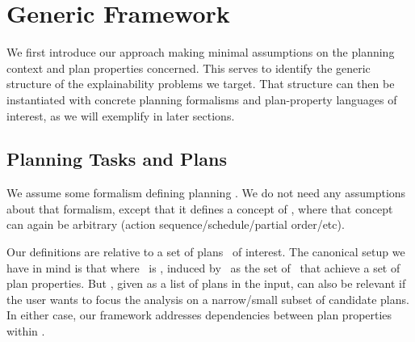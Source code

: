 \section{Generic Framework}

We first introduce our approach making minimal assumptions on the
planning context and plan properties concerned. This serves to
identify the generic structure of the explainability problems we
target. That structure can then be instantiated with concrete planning
formalisms and plan-property languages of interest, as we will
exemplify in later sections.




\subsection{Planning Tasks and Plans}

We assume some formalism defining planning  \task. We
do not need any assumptions about that formalism, except that it
defines a concept of  \plan, where that concept can
again be arbitrary (action sequence/schedule/partial order/etc). 

Our definitions are relative to a set of plans \plans\ of
interest. The canonical setup we have in mind is that where \plans\ is
, induced by \task\ as the set of \plan\ that
achieve a set of  plan properties. But
 \plans, given as a list of plans in the input, can
also be relevant if the user wants to focus the analysis on a
narrow/small subset of candidate plans. In either case, our framework
addresses dependencies between  plan properties
within \plans.
%
%





